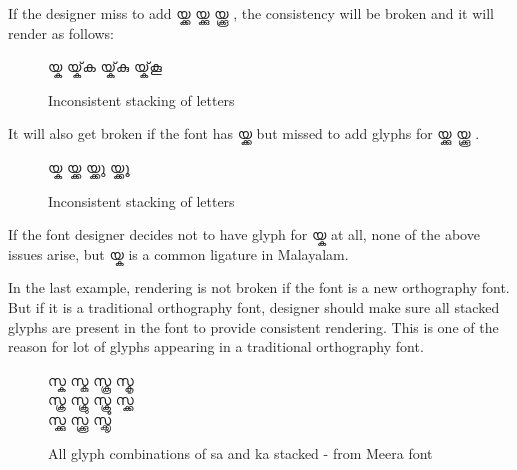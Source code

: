 \begin{enumerate}
If the designer miss to add {\meera യ്ക്ക യ്ക്കു യ്ക്കൂ }, the consistency will
be broken and it will render as follows:
\begin{figure}[h]
  \centering
  {\meera\textexample യ്ക യ്ക്‌ക യ്ക്‌കു യ്ക്‌കൂ }\\
  \caption{Inconsistent stacking of letters}
\end{figure}

It will also get broken if the font has  {\meera യ്ക്ക} but missed to add
glyphs for {\meera യ്ക്കു യ്ക്കൂ }.

\begin{figure}[h]
  \centering
  {\meera\textexample യ്ക യ്ക്ക യ്ക്ക‌ു യ്ക്ക‌ൂ }\\
  \caption{Inconsistent stacking of letters}
\end{figure}

If the font designer decides not to have glyph for {\meera യ്ക } at  all, none
of the above issues arise, but  {\meera യ്ക } is a common ligature in Malayalam.

In the last example, rendering is not broken if the font is a new orthography
font. But if it is a traditional orthography font, designer should make sure all
stacked glyphs are present in the font to provide consistent rendering. This is
one of the reason for lot of glyphs appearing in a traditional orthography font.

\begin{figure}[h]
  \centering
  {\meera\textexample സ്ക സ്കു സ്കൂ സ്കൃ \\ സ്ക്ര സ്ക്രു സ്ക്രൂ സ്ക്ക \\ സ്ക്കു സ്ക്കൂ സ്ക്കൃ }\\
  \caption{All glyph combinations of sa and ka stacked - from Meera font}
\end{figure}

\end{enumerate}
